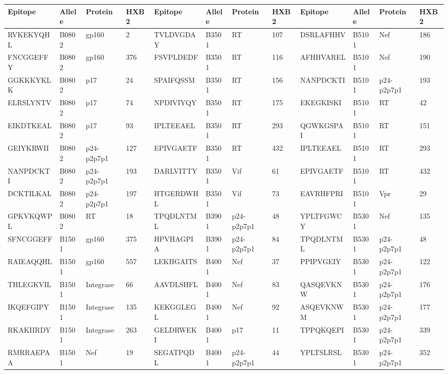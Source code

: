 \begin{table}[htp]
\begin{center}
\begin{sideways}
{
\tiny
\begin{tabulary}{1.5\textwidth}{|l|l|l|l|l|l|l|l|l|l|l|l|}
\hline
Epitope & Allele & Protein & HXB2 & Epitope & Allele & Protein & HXB2 & Epitope & Allele & Protein & HXB2 \bigstrut \\
\hline
RVKEKYQHL & B0802 & gp160 & 2 & TVLDVGDAY & B3501 & RT & 107 & DSRLAFHHV & B5101 & Nef & 186 \bigstrut[t] \\
FNCGGEFFY & B0802 & gp160 & 376 & FSVPLDEDF & B3501 & RT & 116 & AFHHVAREL & B5101 & Nef & 190 \\
GGKKKYKLK & B0802 & p17 & 24 & SPAIFQSSM & B3501 & RT & 156 & NANPDCKTI & B5101 & p24-p2p7p1 & 193 \\
ELRSLYNTV & B0802 & p17 & 74 & NPDIVIYQY & B3501 & RT & 175 & EKEGKISKI & B5101 & RT & 42 \\
EIKDTKEAL & B0802 & p17 & 93 & IPLTEEAEL & B3501 & RT & 293 & QGWKGSPAI & B5101 & RT & 151 \\
GEIYKRWII & B0802 & p24-p2p7p1 & 127 & EPIVGAETF & B3501 & RT & 432 & IPLTEEAEL & B5101 & RT & 293 \\
NANPDCKTI & B0802 & p24-p2p7p1 & 193 & DARLVITTY & B3501 & Vif & 61 & EPIVGAETF & B5101 & RT & 432 \\
DCKTILKAL & B0802 & p24-p2p7p1 & 197 & HTGERDWHL & B3501 & Vif & 73 & EAVRHFPRI & B5101 & Vpr & 29 \\
GPKVKQWPL & B0802 & RT & 18 & TPQDLNTML & B3901 & p24-p2p7p1 & 48 & YPLTFGWCY & B5301 & Nef & 135 \\
SFNCGGEFF & B1501 & gp160 & 375 & HPVHAGPIA & B3901 & p24-p2p7p1 & 84 & TPQDLNTML & B5301 & p24-p2p7p1 & 48 \\
RAIEAQQHL & B1501 & gp160 & 557 & LEKHGAITS & B4001 & Nef & 37 & PPIPVGEIY & B5301 & p24-p2p7p1 & 122 \\
THLEGKVIL & B1501 & Integrase & 66 & AAVDLSHFL & B4001 & Nef & 83 & QASQEVKNW & B5301 & p24-p2p7p1 & 176 \\
IKQEFGIPY & B1501 & Integrase & 135 & KEKGGLEGL & B4001 & Nef & 92 & ASQEVKNWM & B5301 & p24-p2p7p1 & 177 \\
RKAKIIRDY & B1501 & Integrase & 263 & GELDRWEKI & B4001 & p17 & 11 & TPPQKQEPI & B5301 & p24-p2p7p1 & 339 \\
RMRRAEPAA & B1501 & Nef & 19 & SEGATPQDL & B4001 & p24-p2p7p1 & 44 & YPLTSLRSL & B5301 & p24-p2p7p1 & 352 \\

\end{tabulary}}
\end{sideways}
\end{center}
\end{table}
